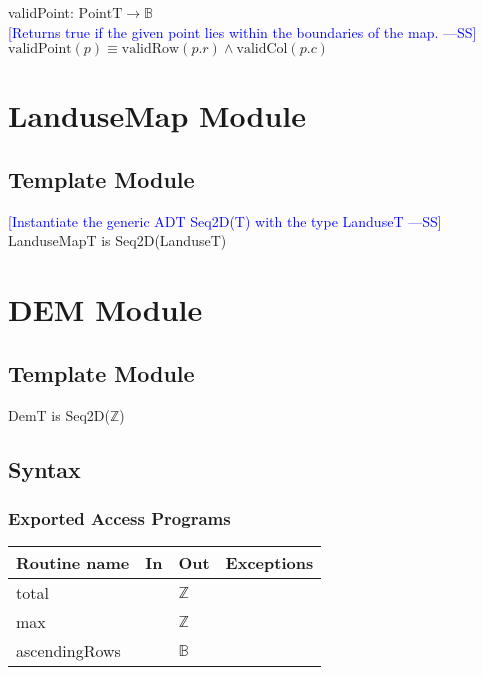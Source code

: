\documentclass[12pt]{article}
\newcommand{\authornote}[3]{\textcolor{#1}{[#3 ---#2]}}
\newcommand{\authornote}[3]{}
\newcommand{\wss}[1]{\authornote{blue}{SS}{#1}}
\begin{document}
\noindent validPoint: $\mbox{PointT} \rightarrow \mathbb{B}$\\
\noindent \wss{Returns true if the given point lies within the boundaries of the
  map.}\\
$\mbox{validPoint}(p) \equiv \mbox{validRow}(p.r) \land \mbox{validCol}(p.c)$

\newpage

\section* {LanduseMap Module}

\subsection* {Template Module}

\wss{Instantiate the generic ADT Seq2D(T) with the type LanduseT}\\
LanduseMapT is Seq2D(LanduseT)

\newpage

\section* {DEM Module}

\subsection* {Template Module}

DemT is Seq2D($\mathbb{Z}$)

\subsection* {Syntax}

\subsubsection* {Exported Access Programs}

\begin{tabular}{| l | l | l | p{6cm} |}
\hline
\textbf{Routine name} & \textbf{In} & \textbf{Out} & \textbf{Exceptions}\\
\hline
total & & $\mathbb{Z}$ & \\
\hline
max &  & $\mathbb{Z}$ & \\
\hline
ascendingRows & & $\mathbb{B}$ & \\
\hline
\end{tabular}
\end{document}
